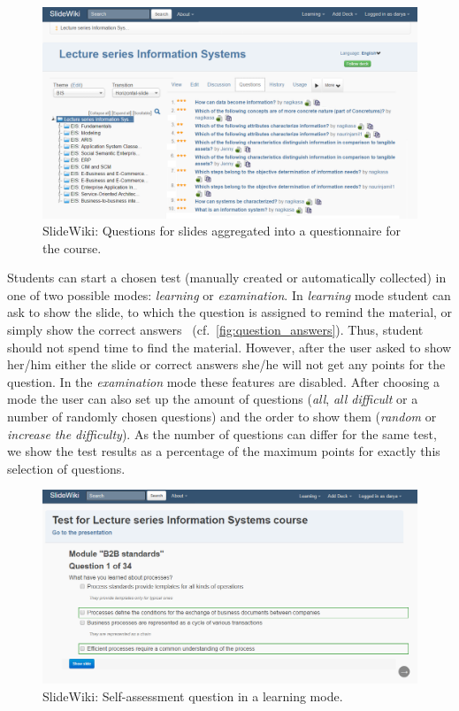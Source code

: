 \documentclass[PhD, Submit, ngerman,UKenglish,table]{scrbook}
\begin{document}
\begin{figure}[h!]
	\centering
		\includegraphics[width=\columnwidth]{images/screenshot_questions.png}
	\caption{SlideWiki: Questions for slides aggregated into a questionnaire for the course.}
	\label{fig:screenshot:questions_tab}
\end{figure}

Students can start a chosen test (manually created or automatically collected) in one of two possible modes: \emph{learning} or \emph{examination}.
In \emph{learning} mode student can ask to show the slide, to which the question is assigned to remind the material, or simply show the correct answers ~(cf.~\autoref{fig:question_answers}).
Thus, student should not spend time to find the material.
However, after the user asked to show her/him either the slide or correct answers she/he will not get any points for the question.
In the \emph{examination} mode these features are disabled.
After choosing a mode the user can also set up the amount of questions (\emph{all}, \emph{all difficult} or a number of randomly chosen questions) and the order to show them (\emph{random} or \emph{increase the difficulty}).
As the number of questions can differ for the same test, we show the test results as a percentage of the maximum points for exactly this selection of questions.

\begin{figure}[h!]
	\centering
		\includegraphics[width=\columnwidth]{images/question_with_answers.png}
	\caption{SlideWiki: Self-assessment question in a learning mode.}
	\label{fig:question_answers}
\end{figure}
\end{document}
